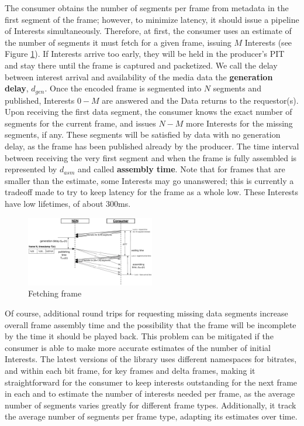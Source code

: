 The consumer obtains the number of segments per frame from metadata in the first segment of the frame; however, to minimize latency, it should issue a pipeline of Interests simultaneously.  Therefore, at first, the consumer uses an estimate of the number of segments it must fetch for a given frame, issuing $M$ Interests (see Figure \ref{fig:pull}). If Interests arrive too early, they will be held in the producer's PIT and stay there until the frame is captured and packetized. We call the delay between interest arrival and availability of the media data the \textbf{generation delay}, $d_{gen}$. Once the encoded frame is segmented into $N$ segments and published, Interests $0 - M$ are answered and the Data returns to the requestor(s). Upon receiving the first data segment, the consumer knows the exact number of segments for the current frame, and issues $N - M$ more Interests for the missing segments, if any. These segments will be satisfied by data with no generation delay, as the frame has been published already by the producer. The time interval between receiving the very first segment and when the frame is fully assembled is represented by $d_{asm}$ and called \textbf{assembly time}. Note that for frames that are smaller than the estimate, some Interests may go unanswered; this is currently a tradeoff made to try to keep latency for the frame as a whole low. These Interests have low lifetimes, of about 300ms. 
 

\begin{figure}[t!]
\centering
\includegraphics[width=0.5\textwidth]{frame-fetch}
\vspace{-18pt}
\caption{Fetching frame}
\label{fig:pull}
\end{figure}

Of course, additional round trips for requesting missing data segments increase overall frame assembly time and the possibility that the frame will be incomplete by the time it should be played back. This problem can be mitigated if the consumer is able to make more accurate estimates of the number of initial Interests. The latest versions of the library uses different namespaces for bitrates, and within each bit frame, for key frames and delta frames, making it straightforward for the consumer to keep interests outstanding for the next frame in each and to estimate the number of interests needed per frame, as the average number of segments varies greatly for different frame types. 
Additionally, it track the average number of segments per frame type, adapting its estimates over time. 

